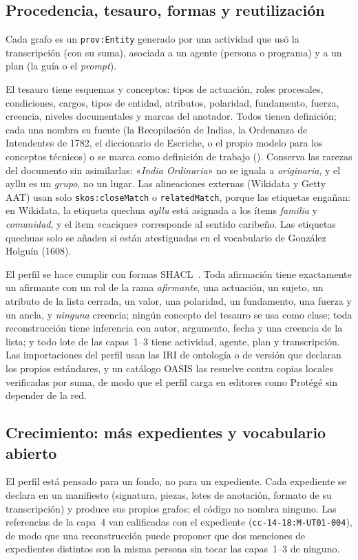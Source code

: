 \documentclass[runningheads]{llncs}
\newcommand{\ttt}[1]{\texttt{\small #1}}
\newcommand{\cita}[1]{«\textit{#1}»}
\begin{document}
\subsection{Procedencia, tesauro, formas y reutilización}
Cada grafo es un \ttt{prov:Entity} generado por una actividad que usó la transcripción (con su suma), asociada a un
agente (persona o programa) y a un plan (la guía o el \emph{prompt}).

El tesauro tiene \cifraEsquemas{} esquemas y \cifraConceptos{} conceptos: tipos de actuación, roles procesales, condiciones, cargos, tipos de
entidad, atributos, polaridad, fundamento, fuerza, creencia, niveles documentales y marcas del anotador. Todos tienen
definición; cada una nombra su fuente (la Recopilación de Indias, la Ordenanza de Intendentes de 1782, el diccionario
de Escriche, o el propio modelo para los conceptos técnicos) o se marca como definición de trabajo (\cifraDefinicionesDeTrabajo). Conserva las
rarezas del documento sin asimilarlas: \cita{India Ordinaria} no se iguala a \emph{originaria}, y el ayllu es un
\emph{grupo}, no un lugar. Las \cifraAlineaciones{} alineaciones externas (Wikidata y Getty AAT) usan solo \ttt{skos:closeMatch} o
\ttt{relatedMatch}, porque las etiquetas engañan: en Wikidata, la etiqueta quechua \emph{ayllu} está asignada a los
ítems \emph{familia} y \emph{comunidad}, y el ítem «cacique» corresponde al sentido caribeño. Las etiquetas quechuas
solo se añaden si están atestiguadas en el vocabulario de González Holguín (1608).

El perfil se hace cumplir con \cifraFormas{} formas SHACL~\cite{shacl}. Toda afirmación tiene exactamente un afirmante con un rol
de la rama \emph{afirmante}, una actuación, un sujeto, un atributo de la lista cerrada, un valor, una polaridad, un
fundamento, una fuerza y un ancla, y \emph{ninguna} creencia; ningún concepto del tesauro se usa como clase; toda
reconstrucción tiene inferencia con autor, argumento, fecha y una creencia de la lista; y todo lote de las capas~1--3
tiene actividad, agente, plan y transcripción. Las importaciones del perfil usan las IRI de ontología o de versión que
declaran los propios estándares, y un catálogo OASIS las resuelve contra copias locales verificadas por suma, de modo
que el perfil carga en editores como Protégé sin depender de la red.

\subsection{Crecimiento: más expedientes y vocabulario abierto}\label{sec:crecimiento}
El perfil está pensado para un fondo, no para un expediente. Cada expediente se declara en un manifiesto (signatura,
piezas, lotes de anotación, formato de su transcripción) y produce sus propios grafos; el código no nombra ninguno.
Las referencias de la capa~4 van calificadas con el expediente (\ttt{cc-14-18:M-UT01-004}), de modo que una
reconstrucción puede proponer que dos menciones de expedientes distintos son la misma persona sin tocar las capas~1--3
de ninguno.
\end{document}
